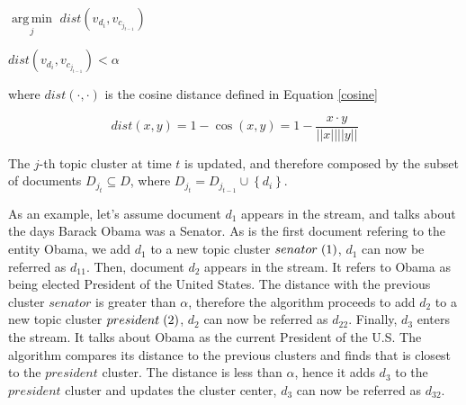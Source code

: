 \documentclass{article}
\DeclareMathOperator*{\argmin}{arg\,min}
\begin{document}
\centerline{$\underset{j}{\argmin}$\;\; $dist(v_{d_i}, v_{c_{j_{t-1}}})$} 
\medskip
\centerline{ $dist(v_{d_i}, v_{c_{j_{t-1}}}) < \alpha$}

where $dist(\cdot,\cdot)$ is the cosine distance defined in Equation \ref{cosine}

\begin{equation}
\label{cosine}
dist(x,y) = 1 - \cos(x,y) = 1 - \frac{x \cdot y}{||x||||y||}
\end{equation}

The $j$-th topic cluster at time $t$ is updated, and therefore composed by the subset of documents $D_{j_t} \subseteq D$, where $D_{j_t} = D_{j_{t-1}} \cup \left\{ {d_i}\right\}$.


As an example, let's assume document $d_1$ appears in the stream, and talks about the days Barack Obama was a Senator. As is the first document refering to the entity Obama, we add $d_1$ to a new topic cluster $senator\hspace{1mm}(1)$, $d_1$ can now be referred as $d_{11}$. Then, document $d_2$ appears in the stream. It refers to Obama as being elected President of the United States. The distance with the previous cluster $senator$ is greater than $\alpha$, therefore the algorithm proceeds to add $d_2$ to a new topic cluster $president\hspace{1mm}(2)$, $d_2$ can now be referred as $d_{22}$. Finally, $d_3$ enters the stream. It talks about Obama as the current President of the U.S. The algorithm compares its distance to the previous clusters and finds that is closest to the $president$ cluster. The distance is less than $\alpha$, hence it adds $d_3$ to the $president$ cluster and updates the cluster center, $d_3$ can now be referred as $d_{32}$.
\end{document}
